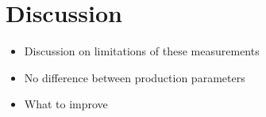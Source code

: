 \section{Discussion}
\label{sec:discussion}

\begin{itemize}
	\item Discussion on limitations of these measurements
	\item No difference between production parameters
	\item What to improve
\end{itemize}